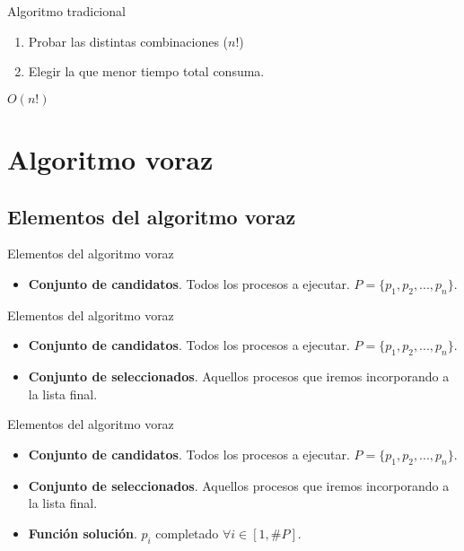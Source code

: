 \documentclass{beamer}
\begin{document}
\begin{frame}[fragile]{Algoritmo tradicional}
\begin{enumerate}
	\item Probar las distintas combinaciones ($n!$)
	\item Elegir la que menor tiempo total consuma.
\end{enumerate}
\vspace{2cm}
\Huge{$O(n!)$}
\end{frame}

\section{Algoritmo voraz}

\subsection{Elementos del algoritmo voraz}

\begin{frame}[fragile]{Elementos del algoritmo voraz}
\begin{itemize}
	\item \textbf{Conjunto de candidatos}. Todos los procesos a ejecutar. $P=\{p_1, p_2, ..., p_n\}$.
\end{itemize}
\end{frame}

\begin{frame}[fragile]{Elementos del algoritmo voraz}
\begin{itemize}
	\item \textbf{Conjunto de candidatos}. Todos los procesos a ejecutar. $P=\{p_1, p_2, ..., p_n\}$.
	\item \textbf{Conjunto de seleccionados}. Aquellos procesos que iremos incorporando a la lista final.
\end{itemize}
\end{frame}

\begin{frame}[fragile]{Elementos del algoritmo voraz}
\begin{itemize}
	\item \textbf{Conjunto de candidatos}. Todos los procesos a ejecutar. $P=\{p_1, p_2, ..., p_n\}$.
	\item \textbf{Conjunto de seleccionados}. Aquellos procesos que iremos incorporando a la lista final.
	\item \textbf{Función solución}. $p_i$ completado $\forall i \in [1,\#P]$.
\end{itemize}
\end{frame}
\end{document}
